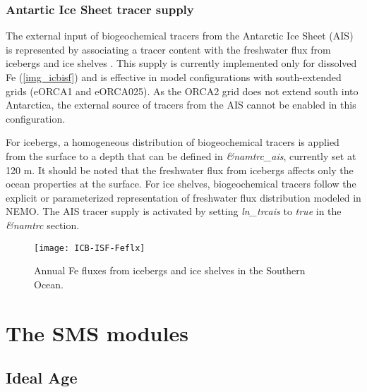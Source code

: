 \documentclass[../main/TOP_manual]{subfiles}
\begin{document}
\subsubsection{Antartic Ice Sheet tracer supply}

The external input of biogeochemical tracers from the Antarctic Ice Sheet (AIS) is represented by associating a tracer content with the freshwater flux from icebergs and ice shelves \citep{person_sensitivity_2019}. This supply is currently implemented only for dissolved Fe (\autoref{img_icbisf}) and is effective in model configurations with south-extended grids (eORCA1 and eORCA025). As the ORCA2 grid does not extend south into Antarctica, the external source of tracers from the AIS cannot be enabled in this configuration. 

For icebergs, a homogeneous distribution of biogeochemical tracers is applied from the surface to a depth that can be defined in \textit{\&namtrc\_ais}, currently set at 120 m. It should be noted that the freshwater flux from icebergs affects only the ocean properties at the surface. For ice shelves, biogeochemical tracers follow the explicit or parameterized representation of freshwater flux distribution modeled in NEMO. The AIS tracer supply is activated by setting \textit{ln\_trcais} to \textit{true} in the \textit{\&namtrc} section.

\begin{figure}[!h]
	\centering
	\texttt{[image: ICB-ISF-Feflx]}
	\caption{Annual Fe fluxes from icebergs and ice shelves in the Southern Ocean.}
	\label{img_icbisf}
\end{figure}


\section{The SMS modules}

\label{SMS_models}

\subsection{Ideal Age}
\end{document}
